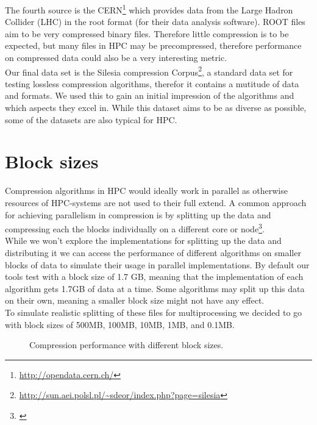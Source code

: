 \documentclass[
	12pt,
	a4paper,
	BCOR10mm,
	DIV14,
	listof=totoc,
	bibliography=totoc,
	headsepline
]{scrreprt}
\newcommand*{\mcite}[1]{\footnote{\cite{#1}}}
\begin{document}
The fourth source is the CERN\footnote{\url{http://opendata.cern.ch/}} which provides data from the Large Hadron Collider (LHC) in the root format (for their data analysis software).
ROOT files aim to be very compressed binary files. Therefore little compression is to be expected, but many files in HPC may be precompressed, therefore performance on compressed data could also be a very interesting metric.
\\

Our final data set is the Silesia compression Corpus\footnote{\url{http://sun.aei.polsl.pl/~sdeor/index.php?page=silesia}}, a standard data set for testing lossless compression algorithms, therefor it contains a mutitude of data and formats. We used this to gain an initial impression of the algorithms and which aspects they excel in. While this dataset aims to be as diverse as possible, some of the datasets are also typical for HPC.
\\

\newpage
\section*{Block sizes}
Compression algorithms in HPC would ideally work in parallel as otherwise resources of HPC-systems are not used to their full extend.
A common approach for achieving parallelism in compression is by splitting up the data and compressing each the blocks individually on a different core or node\mcite{BenComp}. \\
While we won't explore the implementations for splitting up the data and distributing it we can access the performance of different algorithms on smaller blocks of data to simulate their usage in parallel implementations. 
By default our tools test with a block size of 1.7 GB, meaning that the implementation of each algorithm gets 1.7GB of data at a time. 
Some algorithms may split up this data on their own, meaning a smaller block size might not have any effect. \\%
To simulate realistic splitting of these files for multiprocessing we decided to go with block sizes of 500MB, 100MB, 10MB, 1MB, and 0.1MB.

\begin{figure}[h]
\begin{center}
	\scalebox{0.75}{}
\end{center}
\caption{Compression performance with different block sizes.}
\label{fig:sc_res}
\end{figure}
\end{document}
